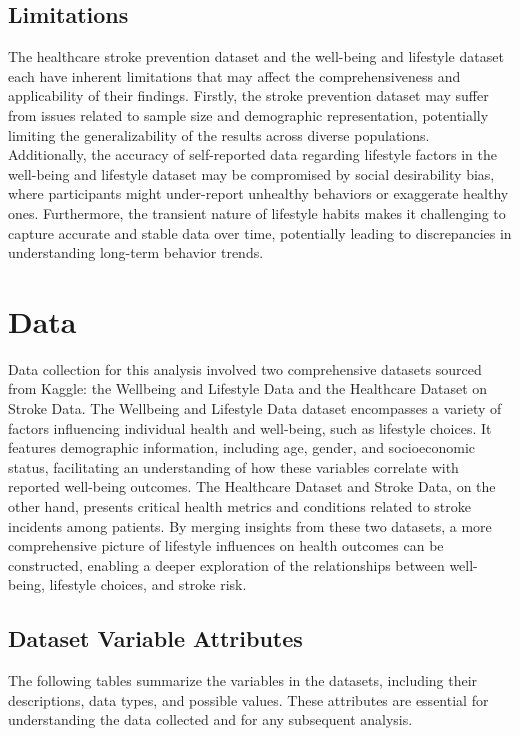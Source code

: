 \documentclass[runningheads]{llncs}
\begin{document}
\begin{enumerate}
\subsection{Limitations}
The healthcare stroke prevention dataset and the well-being and lifestyle dataset each have inherent limitations that may affect the comprehensiveness and applicability of their findings. Firstly, the stroke prevention dataset may suffer from issues related to sample size and demographic representation, potentially limiting the generalizability of the results across diverse populations. Additionally, the accuracy of self-reported data regarding lifestyle factors in the well-being and lifestyle dataset may be compromised by social desirability bias, where participants might under-report unhealthy behaviors or exaggerate healthy ones. Furthermore, the transient nature of lifestyle habits makes it challenging to capture accurate and stable data over time, potentially leading to discrepancies in understanding long-term behavior trends.

\section{Data}
Data collection for this analysis involved two comprehensive datasets sourced from Kaggle: the Wellbeing and Lifestyle Data and the Healthcare Dataset on Stroke Data. The Wellbeing and Lifestyle Data dataset encompasses a variety of factors influencing individual health and well-being, such as lifestyle choices. It features demographic information, including age, gender, and socioeconomic status, facilitating an understanding of how these variables correlate with reported well-being outcomes. The Healthcare Dataset and Stroke Data, on the other hand, presents critical health metrics and conditions related to stroke incidents among patients. By merging insights from these two datasets, a more comprehensive picture of lifestyle influences on health outcomes can be constructed, enabling a deeper exploration of the relationships between well-being, lifestyle choices, and stroke risk.


\subsection{Dataset Variable Attributes}

The following tables summarize the variables in the datasets, including their descriptions, data types, and possible values. These attributes are essential for understanding the data collected and for any subsequent analysis.


\end{enumerate}
\end{document}
